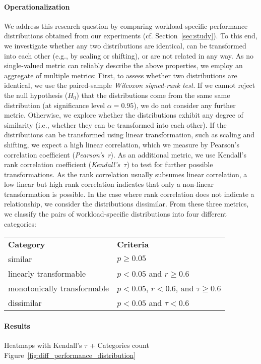 \paragraph*{Operationalization}
We address this research question by comparing workload-specific performance distributions obtained from our experiments (cf. Section~\ref{sec:study}). To this end, we investigate whether any two distributions are identical, can be transformed into each other (e.g., by scaling or shifting), or are not related in any way. As no single-valued metric can reliably describe the above properties, we employ an aggregate of multiple metrics: First, to assess whether two distributions are identical, we use the paired-sample \emph{Wilcoxon signed-rank test}. If we cannot reject the null hypothesis ($H_0$) that the distributions come from the same same distribution (at significance level $\alpha=0.95$), we do not consider any further metric. 
Otherwise, we explore whether the distributions exhibit any degree of similarity (i.e., whether they can be transformed into each other). If the distributions can be transformed using linear transformation, such as scaling and shifting, we expect a high linear correlation, which we measure by Pearson’s correlation coefficient (\emph{Pearson's~r}). As an additional metric, we use Kendall’s rank correlation coefficient (\emph{Kendall's~$\tau$}) to test for further possible transformations. As the rank correlation usually subsumes linear correlation, a low linear but high rank correlation indicates that only a non-linear transformation is possible. In the case where rank correlation does not indicate a relationship, we consider the distributions dissimilar. From these three metrics, we classify the pairs of workload-specific distributions into four different categories:
\vspace{1mm}

\begin{tabular}{p{3.9cm}l}
	 \textbf{Category} & \textbf{Criteria} \\
	{similar} & $p \geq 0.05$ \\
	{linearly transformable} & $p < 0.05$ and $r \geq 0.6$ \\
	{monotonically transformable} & $p < 0.05$, $r < 0.6$, and $\tau \geq 0.6$ \\
	{dissimilar}  & $p < 0.05$ and $\tau < 0.6$ \\
\end{tabular}

\paragraph*{Results} {\color{blue} Heatmaps with Kendall's $\tau$ + Categories count Figure~\ref{fig:diff_performance_distribution}}\\

